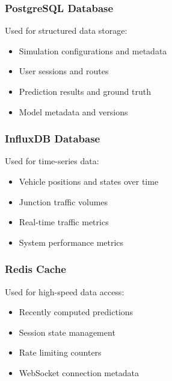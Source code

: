 \subsubsection{PostgreSQL Database}

Used for structured data storage:
\begin{itemize}
    \item Simulation configurations and metadata
    \item User sessions and routes
    \item Prediction results and ground truth
    \item Model metadata and versions
\end{itemize}

\subsubsection{InfluxDB Database}

Used for time-series data:
\begin{itemize}
    \item Vehicle positions and states over time
    \item Junction traffic volumes
    \item Real-time traffic metrics
    \item System performance metrics
\end{itemize}

\subsubsection{Redis Cache}

Used for high-speed data access:
\begin{itemize}
    \item Recently computed predictions
    \item Session state management
    \item Rate limiting counters
    \item WebSocket connection metadata
\end{itemize}


